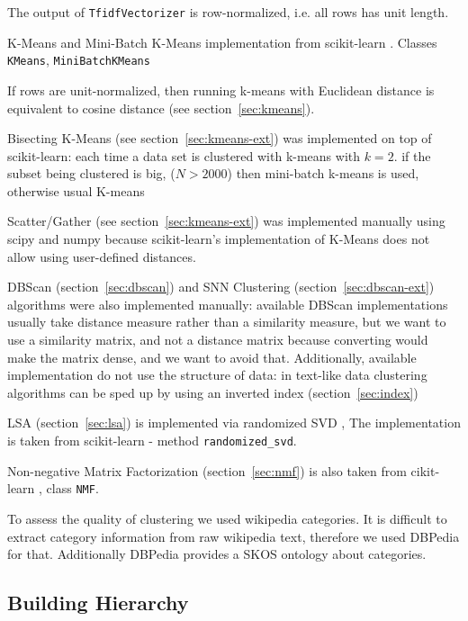 The output of \verb|TfidfVectorizer| is row-normalized, i.e. 
all rows has unit length. 


K-Means and Mini-Batch K-Means implementation from scikit-learn \cite{scikit-learn}.
Classes \verb|KMeans|, \verb|MiniBatchKMeans|

If rows are unit-normalized, then running k-means with Euclidean distance
is equivalent to cosine distance (see section~\ref{sec:kmeans}).

Bisecting K-Means (see section~\ref{sec:kmeans-ext}) was implemented on top of scikit-learn: each time a data set is clustered
with k-means with $k = 2$. if the subset being clustered is big, 
($N > 2000$) then mini-batch k-means is used, otherwise usual K-means

Scatter/Gather (see section~\ref{sec:kmeans-ext}) was implemented manually 
using scipy \cite{scipy} and numpy \cite{walt2011numpy} because 
scikit-learn's implementation of K-Means does not allow using user-defined distances. 


DBScan (section~\ref{sec:dbscan}) and SNN Clustering (section~\ref{sec:dbscan-ext})
algorithms were also implemented manually:
available DBScan implementations usually take distance measure rather than 
a similarity measure, but we want to use a similarity matrix, and not 
a distance matrix because converting would make the matrix dense, 
and we want to avoid that. Additionally, available implementation
do not use the structure of data: in text-like data clustering algorithms 
can be sped up by using an inverted index (section~\ref{sec:index})


LSA (section~\ref{sec:lsa}) is implemented via randomized SVD \cite{tropp2009finding},
The implementation is taken from scikit-learn \cite{scikit-learn} - 
method \verb|randomized_svd|.

Non-negative Matrix Factorization (section~\ref{sec:nmf}) is also taken from 
cikit-learn \cite{scikit-learn}, class \verb|NMF|.


To assess the quality of clustering we used wikipedia categories. 
It is difficult to extract category information from raw wikipedia text, therefore
we used DBPedia \cite{bizer2009dbpedia} for that. Additionally 
DBPedia provides a SKOS ontology about categories. 


\subsection{Building Hierarchy} \label{sec:hierarchy}


